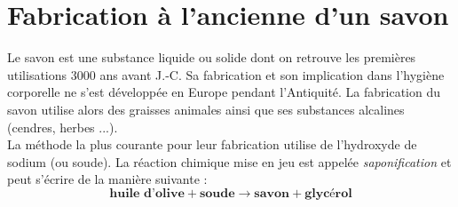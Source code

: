 \documentclass[a4paper,11pt,fleqn]{article}%
\begin{document}
	\maketitle
	
	
	\section{Fabrication à l'ancienne d'un savon}
Le savon est une substance liquide ou solide dont on retrouve les premières utilisations 3000 ans avant J.-C. Sa fabrication et son implication dans l'hygiène corporelle ne s'est développée en Europe pendant l'Antiquité. La fabrication du savon utilise alors des graisses animales ainsi que ses substances alcalines (cendres, herbes ...).\\
La méthode la plus courante pour leur fabrication utilise de l'hydroxyde de sodium (ou soude). La réaction chimique mise en jeu est appelée \emph{saponification} et peut s'écrire de la manière suivante :
$$\mathbf{\text{{huile d'olive}} + \text{soude} \rightarrow \text{savon} + \text{glycérol}}$$
\end{document}
